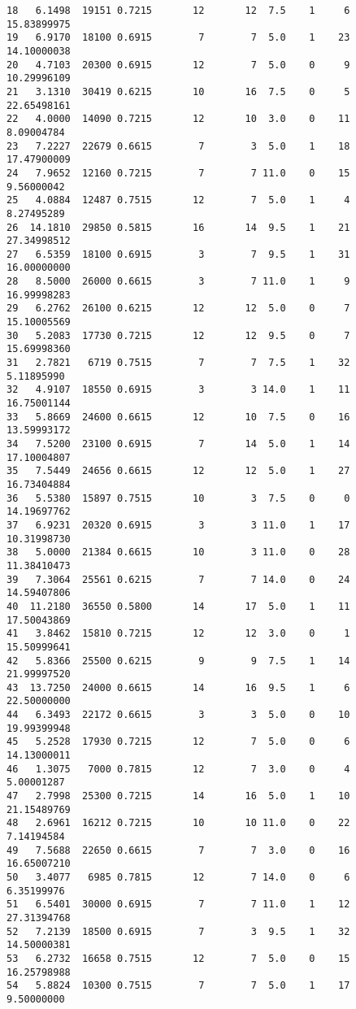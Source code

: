\documentclass[
  letterpaper,
  DIV=11,
  numbers=noendperiod]{scrreprt}
\begin{document}
\begin{verbatim}
18   6.1498  19151 0.7215       12       12  7.5    1     6 15.83899975
19   6.9170  18100 0.6915        7        7  5.0    1    23 14.10000038
20   4.7103  20300 0.6915       12        7  5.0    0     9 10.29996109
21   3.1310  30419 0.6215       10       16  7.5    0     5 22.65498161
22   4.0000  14090 0.7215       12       10  3.0    0    11  8.09004784
23   7.2227  22679 0.6615        7        3  5.0    1    18 17.47900009
24   7.9652  12160 0.7215        7        7 11.0    0    15  9.56000042
25   4.0884  12487 0.7515       12        7  5.0    1     4  8.27495289
26  14.1810  29850 0.5815       16       14  9.5    1    21 27.34998512
27   6.5359  18100 0.6915        3        7  9.5    1    31 16.00000000
28   8.5000  26000 0.6615        3        7 11.0    1     9 16.99998283
29   6.2762  26100 0.6215       12       12  5.0    0     7 15.10005569
30   5.2083  17730 0.7215       12       12  9.5    0     7 15.69998360
31   2.7821   6719 0.7515        7        7  7.5    1    32  5.11895990
32   4.9107  18550 0.6915        3        3 14.0    1    11 16.75001144
33   5.8669  24600 0.6615       12       10  7.5    0    16 13.59993172
34   7.5200  23100 0.6915        7       14  5.0    1    14 17.10004807
35   7.5449  24656 0.6615       12       12  5.0    1    27 16.73404884
36   5.5380  15897 0.7515       10        3  7.5    0     0 14.19697762
37   6.9231  20320 0.6915        3        3 11.0    1    17 10.31998730
38   5.0000  21384 0.6615       10        3 11.0    0    28 11.38410473
39   7.3064  25561 0.6215        7        7 14.0    0    24 14.59407806
40  11.2180  36550 0.5800       14       17  5.0    1    11 17.50043869
41   3.8462  15810 0.7215       12       12  3.0    0     1 15.50999641
42   5.8366  25500 0.6215        9        9  7.5    1    14 21.99997520
43  13.7250  24000 0.6615       14       16  9.5    1     6 22.50000000
44   6.3493  22172 0.6615        3        3  5.0    0    10 19.99399948
45   5.2528  17930 0.7215       12        7  5.0    0     6 14.13000011
46   1.3075   7000 0.7815       12        7  3.0    0     4  5.00001287
47   2.7998  25300 0.7215       14       16  5.0    1    10 21.15489769
48   2.6961  16212 0.7215       10       10 11.0    0    22  7.14194584
49   7.5688  22650 0.6615        7        7  3.0    0    16 16.65007210
50   3.4077   6985 0.7815       12        7 14.0    0     6  6.35199976
51   6.5401  30000 0.6915        7        7 11.0    1    12 27.31394768
52   7.2139  18500 0.6915        7        3  9.5    1    32 14.50000381
53   6.2732  16658 0.7515       12        7  5.0    0    15 16.25798988
54   5.8824  10300 0.7515        7        7  5.0    1    17  9.50000000

\end{verbatim}
\end{document}
